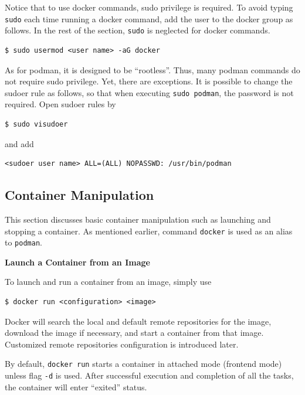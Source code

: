Notice that to use docker commands, sudo privilege is required. To avoid typing \verb|sudo| each time running a docker command, add the user to the docker group as follows. In the rest of the section, \verb|sudo| is neglected for docker commands.
\begin{lstlisting}
$ sudo usermod <user name> -aG docker
\end{lstlisting}
As for podman, it is designed to be ``rootless''. Thus, many podman commands do not require sudo privilege. Yet, there are exceptions. It is possible to change the sudoer rule as follows, so that when executing \verb|sudo podman|, the password is not required. Open sudoer rules by
\begin{lstlisting}
$ sudo visudoer
\end{lstlisting}
and add
\begin{lstlisting}
<sudoer user name> ALL=(ALL) NOPASSWD: /usr/bin/podman
\end{lstlisting}

\subsection{Container Manipulation}

This section discusses basic container manipulation such as launching and stopping a container. As mentioned earlier, command \verb|docker| is used as an alias to \verb|podman|.

\vspace{0.1in}
\noindent \textbf{Launch a Container from an Image}
\vspace{0.1in}

To launch and run a container from an image, simply use
\begin{lstlisting}
$ docker run <configuration> <image>
\end{lstlisting}
Docker will search the local and default remote repositories for the image, download the image if necessary, and start a container from that image. Customized remote repositories configuration is introduced later.

By default, \verb|docker run| starts a container in attached mode (frontend mode) unless flag \verb|-d| is used. After successful execution and completion of all the tasks, the container will enter ``exited'' status. 

